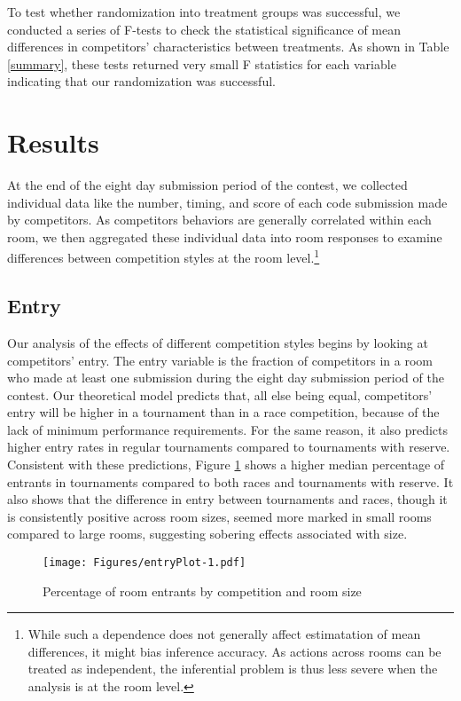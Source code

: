 \documentclass[10pt, titlepage]{article}
\begin{document}
To test whether randomization into treatment groups was successful, we
conducted a series of F-tests to check the statistical significance of
mean differences in competitors' characteristics between treatments. As
shown in Table \ref{summary}, these tests returned very small F
statistics for each variable indicating that our randomization was
successful.

\section{Results}\label{results}

At the end of the eight day submission period of the contest, we
collected individual data like the number, timing, and score of each
code submission made by competitors. As competitors behaviors are
generally correlated within each room, we then aggregated these
individual data into room responses to examine differences between
competition styles at the room level.\footnote{While such a dependence
  does not generally affect estimatation of mean differences, it might
  bias inference accuracy. As actions across rooms can be treated as
  independent, the inferential problem is thus less severe when the
  analysis is at the room level.}

\subsection{Entry}\label{entry}

Our analysis of the effects of different competition styles begins by
looking at competitors' entry. The entry variable is the fraction of
competitors in a room who made at least one submission during the eight
day submission period of the contest. Our theoretical model predicts
that, all else being equal, competitors' entry will be higher in a
tournament than in a race competition, because of the lack of minimum
performance requirements. For the same reason, it also predicts higher
entry rates in regular tournaments compared to tournaments with reserve.
Consistent with these predictions, Figure \ref{room entrants} shows a
higher median percentage of entrants in tournaments compared to both
races and tournaments with reserve. It also shows that the difference in
entry between tournaments and races, though it is consistently positive
across room sizes, seemed more marked in small rooms compared to large
rooms, suggesting sobering effects associated with size.

\begin{figure}
\caption{Percentage of room entrants by competition and room size}
\label{room entrants}
\texttt{[image: Figures/entryPlot-1.pdf]}
\end{figure}
\end{document}
